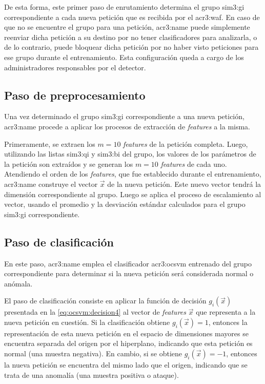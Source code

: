 De esta forma, este primer paso de enrutamiento determina el grupo
\gls{sim3:gi} correspondiente a cada nueva petición que es recibida
por el \gls{acr3:waf}.
En caso de que no se encuentre el grupo para una petición, \gls{acr3:name}
puede simplemente reenviar dicha petición a su destino por no tener
clasificadores para analizarla, o de lo contrario, puede bloquear dicha
petición por no haber visto peticiones para ese grupo durante el
entrenamiento. Esta configuración queda a cargo de los administradores
responsables por el detector.


\subsection{Paso de preprocesamiento}

Una vez determinado el grupo \gls{sim3:gi} correspondiente a una nueva
petición, \gls{acr3:name} procede a aplicar los procesos de extracción
de \textit{features} a la misma.

Primeramente, se extraen los $m = 10$ \textit{features} de la petición
completa. Luego, utilizando las listas \gls{sim3:qi} y \gls{sim3:bi} del
grupo, los valores de los parámetros de la petición son extraídos y se
generan los $m = 10$ \textit{features} de cada uno.
Atendiendo el orden de los \textit{features}, que fue establecido durante
el entrenamiento, \gls{acr3:name} construye el vector $\vec{x}$ de la
nueva petición. Este nuevo vector tendrá la dimensión correspondiente al
grupo.
Luego se aplica el proceso de escalamiento al vector, usando el promedio
y la desviación estándar calculados para el grupo \gls{sim3:gi}
correspondiente.


\subsection{Paso de clasificación}

En este paso, \gls{acr3:name} emplea el clasificador \gls{acr3:ocsvm}
entrenado del grupo correspondiente para determinar si la nueva petición
será considerada normal o anómala.

El paso de clasificación consiste en aplicar la función de decisión
$g_{i}(\vec{x})$ presentada en la \autoref{eq:ocsvm:decision4} al vector
de \textit{features} $\vec{x}$ que representa a la nueva petición en
cuestión.
Si la clasificación obtiene $g_{i}(\vec{x}) = 1$, entonces la representación
de esta nueva petición en el espacio de dimensiones mayores se encuentra
separada del origen por el hiperplano, indicando que esta petición es
normal (una muestra negativa).
En cambio, si se obtiene $g_{i}(\vec{x}) = -1$, entonces la nueva petición
se encuentra del mismo lado que el origen, indicando que se trata de una
anomalía (una muestra positiva o ataque).


